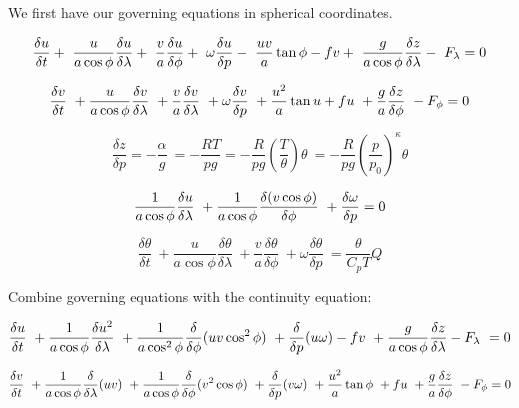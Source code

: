 \documentclass{article}
\begin{document}
We first have our governing equations in spherical coordinates.

\begin{equation}
\frac{\delta u}{\delta t} + \
\frac{u}{a\cos{\phi}} \frac{\delta u}{\delta \lambda}+ \
\frac{v}{a} \frac{\delta u}{\delta \phi} + \
\omega \frac{\delta u}{\delta p} - \
\frac{uv}{a} \tan{\phi} - fv + \
\frac{g}{a \cos{\phi}} \frac{\delta z}{\delta \lambda} - \
F_\lambda = 0
\label{ugov}
\end{equation}

\begin{equation}
\frac{\delta v}{\delta t} \
+ \frac{u}{a \cos{\phi}} \frac{\delta v}{\delta \lambda} \
+ \frac{v}{a} \frac{\delta v}{\delta \lambda} \
+ \omega \frac{\delta v}{\delta p} \
+ \frac{u^2}{a} \tan{u} + fu \
+ \frac{g}{a} \frac{\delta z}{\delta \phi} \
- F_\phi = 0
\label{vgov}
\end{equation}

\begin{equation}
\frac{\delta z}{\delta p} = - \frac{\alpha}{g} \
= - \frac{RT}{pg} = - \frac{R}{pg}(\frac{T}{\theta})\theta \
= - \frac{R}{pg}(\frac{p}{p_0})^\kappa \theta
\label{Zgov}
\end{equation}

\begin{equation}
\frac{1}{a \cos{\phi}} \frac{\delta u}{\delta \lambda} \
+ \frac{1}{a \cos{\phi}} \frac{\delta (v \cos{\phi})}{\delta \phi} \
+ \frac{\delta{\omega}}{\delta p} = 0
\label{cgov}
\end{equation}

\begin{equation}
\frac{\delta \theta}{\delta t} \
+ \frac{u}{a \cos{\phi}} \frac{\delta \theta}{\delta \lambda} \
+ \frac{v}{a} \frac{\delta \theta}{\delta \phi} \
+ \omega \frac{\delta \theta}{\delta p} \
= \frac{\theta}{C_p T} Q
\label{thetagov}
\end{equation}

Combine governing equations with the continuity equation:

\begin{equation}
\frac{\delta u}{\delta t} \
+ \frac{1}{a \cos{\phi}} \frac{\delta u^2}{\delta \lambda} \
+ \frac{1}{a \cos^2{\phi}} \frac{\delta}{\delta \phi}(uv\cos^2{\phi}) \
+ \frac{\delta}{\delta p}(u \omega) - fv \
+ \frac{g}{a \cos{\phi}} \frac{\delta z}{\delta \lambda} - F_\lambda \
= 0 
\end{equation}

\begin{equation}
\frac{\delta v}{\delta t} \
+ \frac{1}{a \cos{\phi}} \frac{\delta}{\delta \lambda}(uv)\
+ \frac{1}{a \cos{\phi}} \frac{\delta}{\delta \phi}(v^2\cos{\phi}) \
+ \frac{\delta}{\delta p}(v \omega) \
+ \frac{u^2}{a} \tan{\phi} \
+ fu \
+ \frac{g}{a} \frac{\delta z}{\delta \phi} \
- F_\phi = 0
\end{equation}
\end{document}
